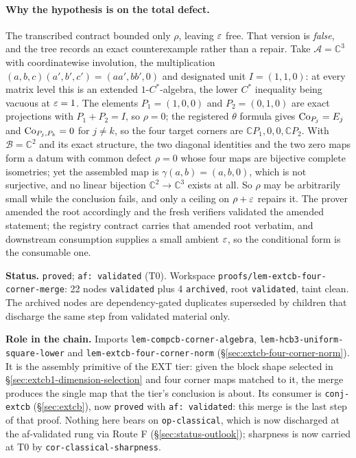 \paragraph{Why the hypothesis is on the total defect.} The transcribed contract bounded
only $\rho$, leaving $\varepsilon$ free. That version is \emph{false}, and the tree records an
exact counterexample rather than a repair. Take $\mathcal A=\mathbb C^{3}$ with
coordinatewise involution, the multiplication
$(a,b,c)(a',b',c')=(aa',bb',0)$ and designated unit $I=(1,1,0)$: at every matrix level
this is an extended $1$-$C^*$-algebra, the lower $C^*$ inequality being vacuous at
$\varepsilon=1$. The elements $P_1=(1,0,0)$ and $P_2=(0,1,0)$ are exact projections with
$P_1+P_2=I$, so $\rho=0$; the registered $\theta$ formula gives $\mathrm{Co}_{P_j}=E_j$ and
$\mathrm{Co}_{P_j,P_k}=0$ for $j\ne k$, so the four target corners are
$\mathbb C P_1,0,0,\mathbb C P_2$. With $\mathcal B=\mathbb C^{2}$ and its exact
structure, the two diagonal identities and the two zero maps form a datum with common
defect $\rho=0$ whose four maps are bijective complete isometries; yet the assembled map
is $\gamma(a,b)=(a,b,0)$, which is not surjective, and no linear bijection
$\mathbb C^{2}\to\mathbb C^{3}$ exists at all. So $\rho$ may be arbitrarily small while
the conclusion fails, and only a ceiling on $\rho+\varepsilon$ repairs it. The prover amended the
root accordingly and the fresh verifiers validated the amended statement; the registry
contract carries that amended root verbatim, and downstream consumption supplies a small
ambient $\varepsilon$, so the conditional form is the consumable one.

\medskip
\noindent\textbf{Status.} \texttt{proved}; \texttt{af: validated} (T0). Workspace
\texttt{proofs/lem-extcb-four-corner-merge}: 22 nodes \texttt{validated} plus 4
\texttt{archived}, root \texttt{validated}, taint clean. The archived nodes are
dependency-gated duplicates superseded by children that discharge the same step from
validated material only.

\noindent\textbf{Role in the chain.} Imports \texttt{lem-compcb-corner-algebra},
\texttt{lem-hcb3-uniform-square-lower} and \texttt{lem-extcb-four-corner-norm}
(\S\ref{sec:extcb-four-corner-norm}). It is the assembly primitive of the EXT tier: given
the block shape selected in \S\ref{sec:extcb1-dimension-selection} and four corner maps
matched to it, the merge produces the single map that the tier's conclusion is about. Its
consumer is \texttt{conj-extcb} (\S\ref{sec:extcb}), now \texttt{proved} with
\texttt{af: validated}: this merge is the last step of that proof. Nothing here bears on
\texttt{op-classical}, which is now discharged at the af-validated rung via Route F (\S\ref{sec:status-outlook}); sharpness is now carried at T0 by \texttt{cor-classical-sharpness}.
